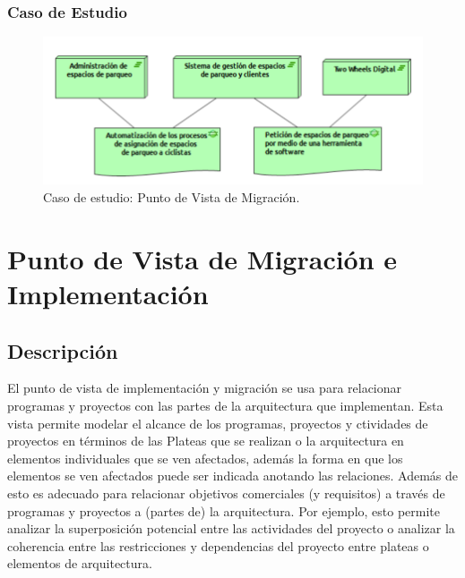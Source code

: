 \subsubsection{Caso de Estudio}


\begin{figure}[H]
	\centering
	\includegraphics[width=1.0\textwidth]{imagenes/Caso_Estudio/Migracion/Migracion.PDF}
	\caption{Caso de estudio: Punto de Vista de Migración.}
	\label{fig:gap_analysis}
\end{figure}

\section{Punto de Vista de Migración e Implementación}

\subsection{Descripción}
El punto de vista de implementación y migración se usa para relacionar programas y proyectos con las partes de la arquitectura que implementan. Esta vista permite modelar el alcance de los programas, proyectos y ctividades de proyectos en términos de las Plateas que se realizan o la arquitectura en elementos individuales que se ven afectados, además la forma en que los elementos se ven afectados puede ser indicada anotando las relaciones.
Además  de esto es adecuado para relacionar objetivos comerciales (y requisitos) a través de programas y proyectos a (partes de) la arquitectura. Por ejemplo, esto permite analizar la superposición potencial entre las actividades del proyecto o analizar la coherencia entre las restricciones y dependencias del proyecto entre plateas o elementos de arquitectura.

